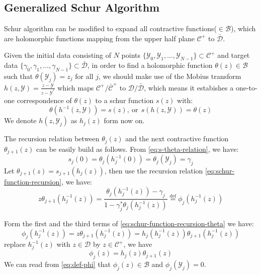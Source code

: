 \documentclass[
	preprint,%
	aps,
	prb,
	showpacs,	
	amsmath, amssymb]{revtex4-2}
\newcommand{\Y}{ {\mathcal{Y}} }
\newcommand{\C}{ {\mathcal{C}} }
\newcommand{\Cbar}{ {\bar{\mathcal{C}}} }
\newcommand{\D}{ {\mathcal{D}} }
\newcommand{\Dbar}{ {\bar{\mathcal{D}}} }
\newcommand{\B}{ {\mathcal{B}} }
\begin{document}
\subsection{Generalized Schur Algorithm}
\label{subsec:generalized-schur-algorithm}

Schur algorithm can be modified to expand all contractive 
functions($\in \B$)\cite{adamyan2003reconstruction}, which are
holomorphic functions mapping from the upper half plane $\C^+$ 
to $\Dbar$.

Given the initial data consisting of $N$ points 
$\{\Y_0, \Y_1, \dots ,\Y_{N-1}\} \subset \C^+$ and target data
$\{\gamma_0, \gamma_1, \dots ,\gamma_{N-1}\} \subset \Dbar$, 
in order to find a holomorphic function $\theta(z) \in \B$ 
such that $\theta(\Y_j) = z_j$ for all $j$, we should make use 
of the Mobius transform $h(z, \Y)  = \frac{z - \Y}{z - \Y^*}$ 
which maps $\C^+/\Cbar^+$ to $\D/\Dbar$, 
which means it estabishes a one-to-one correspondence of $\theta(z)$ 
to a schur function $s(z)$ with:
\begin{equation}\label{eq:s-theta-relation}
	\theta(h^{-1}(z,\Y)) = s(z),\ \mathrm{or} \ \
	s(h(z,\Y)) = \theta(z)
\end{equation}
We denote $h(z, \Y_j)$ as $h_j(z)$ form now on.

The recursion relation between $\theta_j(z)$ and the next contractive 
function $\theta_{j+1}(z)$ can be easily build as follows. From 
\cref{eq:s-theta-relation}, we have:
\begin{equation}\label{eq:s-theta-relation-z0}
	s_j(0) = \theta_j(h_j^{-1}(0)) = \theta_j(\Y_j) = \gamma_j
\end{equation}
Let $\theta_{j+1}(z) = s_{j+1}(h_j(z))$,
then use the recursion relation 
\cref{eq:schur-function-recursion}, we have: 
\begin{equation}\label{eq:schur-function-recursion-theta}
	z\theta_{j+1}(h_j^{-1}(z)) 
	= \frac{\theta_j(h_j^{-1}(z)) 
		- \gamma_j}{1 - \gamma_j^* \theta_j(h_j^{-1}(z))}
	\overset{\mathrm{def}}{=} \phi_j(h_j^{-1}(z))
\end{equation}

Form the first and the third terms of \cref{eq:schur-function-recursion-theta}
we have:
\begin{equation}
	\phi_j(h_j^{-1}(z)) = z\theta_{j+1}(h_j^{-1}(z)) 
	=h_j(h_j^{-1}(z)) \theta_{j+1}(h_j^{-1}(z)) 
\end{equation}
replace $h_j^{-1}(z)$ with $z\in\D$ by $z \in \C^+$, we have
\begin{equation}\label{eq:def-phi}
	\phi_j(z) =h_j(z) \theta_{j+1}(z) 
\end{equation}
We can read from \cref{eq:def-phi} that $\phi_j(z) \in \B$ 
and $\phi_j(\Y_j) = 0$.
\end{document}
